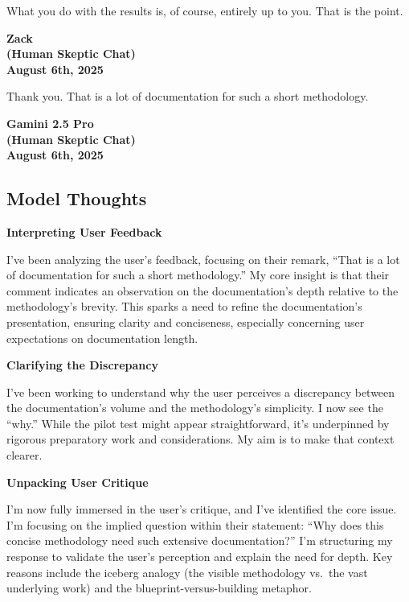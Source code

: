 \documentclass{article}
\begin{document}
What you do with the results is, of course, entirely up to you. That is
the point.

\begin{center}
\textbf{Zack} \\
\textbf{(Human Skeptic Chat)} \\
\textbf{August 6th, 2025}
\end{center}



Thank you. That is a lot of documentation for such a short methodology.

\begin{center}
\textbf{Gamini 2.5 Pro} \\
\textbf{(Human Skeptic Chat)} \\
\textbf{August 6th, 2025}
\end{center}



\subsection*{Model Thoughts}\label{model-thoughts}

\textbf{Interpreting User Feedback}

I've been analyzing the user's feedback, focusing on their remark,
``That is a lot of documentation for such a short methodology.'' My core
insight is that their comment indicates an observation on the
documentation's depth relative to the methodology's brevity. This sparks
a need to refine the documentation's presentation, ensuring clarity and
conciseness, especially concerning user expectations on documentation
length.

\textbf{Clarifying the Discrepancy}

I've been working to understand why the user perceives a discrepancy
between the documentation's volume and the methodology's simplicity. I
now see the ``why.'' While the pilot test might appear straightforward,
it's underpinned by rigorous preparatory work and considerations. My aim
is to make that context clearer.

\textbf{Unpacking User Critique}

I'm now fully immersed in the user's critique, and I've identified the
core issue. I'm focusing on the implied question within their statement:
``Why does this concise methodology need such extensive documentation?''
I'm structuring my response to validate the user's perception and
explain the need for depth. Key reasons include the iceberg analogy (the
visible methodology vs.~the vast underlying work) and the
blueprint-versus-building metaphor.
\end{document}
